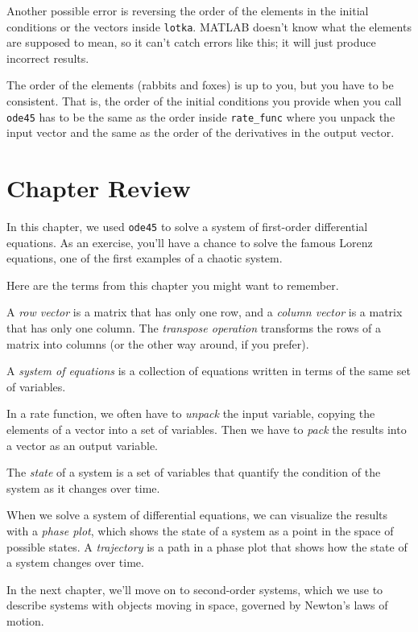 
Another possible error is reversing the order of the elements in the
initial conditions or the vectors inside \lstinline{lotka}.  MATLAB
doesn't know what the elements are supposed to mean, so it can't catch
errors like this; it will just produce incorrect results.

The order of the elements (rabbits and foxes) is up to you, but
you have to be consistent.  That is, the order of the initial conditions you
provide when you call \lstinline{ode45} has to be the same as the order
inside \lstinline{rate_func} where you unpack the input vector and the
same as the order of the derivatives in the output vector.

\section{Chapter Review}

In this chapter, we used \lstinline{ode45} to solve a system of first-order differential equations.
As an exercise, you'll have a chance to solve the famous Lorenz equations, one of the first examples of a chaotic system.

Here are the terms from this chapter you might want to remember.

A \emph{row vector} is a matrix that has only one row, and a \emph{column vector} is a matrix that has only one column.
The \emph{transpose operation} transforms the \linebreak rows of a matrix
into columns (or the other way around, if you prefer).

A \emph{system of equations} is a collection of equations written in terms of
the same set of variables.

In a rate function, we often have to \emph{unpack} the input variable,
copying the elements of a vector into a set of variables.
Then we have to \emph{pack} the results into a vector as an output variable.

The \emph{state} of a system is a set of variables that quantify the condition of the system as it changes over time.

When we solve a system of differential equations, we can visualize the results with a \emph{phase plot}, which shows the state of a system as a point in the space of possible states.
A \emph{trajectory} is a path in a phase plot that shows how the state of a system changes over time.

In the next chapter, we'll move on to second-order systems, which we use to describe systems
with objects moving in space, governed by Newton's laws of motion.


